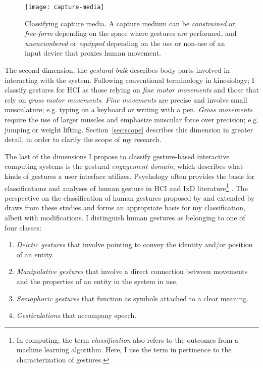 \begin{SCfigure}[\sidecaptionrelwidth][t]
\centering
\texttt{[image: capture-media]}
\caption{Classifying capture media. A capture medium can be \emph{constrained} or \emph{free-form} depending on the space where gestures are performed, and \emph{unencumbered} or \emph{equipped} depending on the use or non-use of an input device that proxies human movement.}
\label{fig:capture-media}
\end{SCfigure}

The second dimension, the \emph{gestural bulk} describes body parts involved in interacting with the system. Following conventional terminology in kinesiology; I classify gestures for HCI as those relying on \emph{fine motor movements}  and those that rely on \emph{gross motor movements}. \emph{Fine movements} are precise and involve small musculature; e.g. typing on a keyboard or writing with a pen. \emph{Gross movements} require the use of larger muscles and emphasize muscular force over precision; e.g. jumping or weight lifting. Section~\ref{sec:scope} describes this dimension in greater detail, in order to clarify the scope of my research.

The last of the dimensions I propose to classify gesture-based interactive computing systems is the gestural \emph{engagement domain}, which describes what kinds of gestures a user interface utilizes. Psychology \parencite{McNeill:1992, McNeill:2008} often provides the basis for classifications and analyses of human gesture in HCI and IxD literature\footnote{In computing, the term \emph{classification} also refers to the outcomes from a machine learning algorithm. Here, I use the term in pertinence to the characterization of gestures.} \parencite{Eisenstein:2006, Kettebekov:2004, Wexelblat:1997}. The perspective on the classification of human gestures proposed by \textcite{Quek:2002} and extended by \textcite{Karam:2005} draws from these studies and forms an appropriate basis for my classification, albeit with modifications. I distinguish human gestures as belonging to one of four classes:

\begin{enumerate}
\item \emph{Deictic gestures} that involve pointing to convey the identity and/or position of an entity.
\item \emph{Manipulative gestures} that involve a direct connection between movements and the properties of an entity in the system in use.
\item \emph{Semaphoric gestures} that function as symbols attached to a clear meaning.
\item \emph{Gesticulations} that accompany speech.
\end{enumerate}

